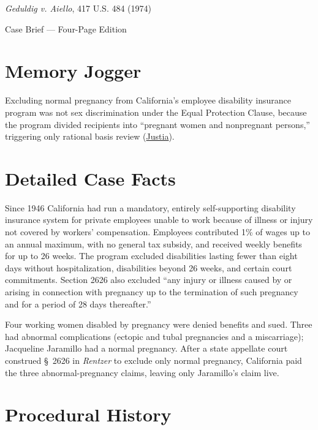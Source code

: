 \documentclass[12pt]{article}
\begin{document}
\begin{center}
{\LARGE \textit{Geduldig v. Aiello}, 417 U.S. 484 (1974)\par}
\vspace{0.8em}
{\large Case Brief --- Four-Page Edition\par}
\end{center}
\vspace{1em}

\section{Memory Jogger}

Excluding normal pregnancy from California's employee disability insurance program was not sex discrimination under the Equal Protection Clause, because the program divided recipients into ``pregnant women and nonpregnant persons,'' triggering only rational basis review (\href{https://supreme.justia.com/cases/federal/us/417/484/}{Justia}).

\section{Detailed Case Facts}

Since 1946 California had run a mandatory, entirely self-supporting disability insurance system for private employees unable to work because of illness or injury not covered by workers' compensation. Employees contributed 1\% of wages up to an annual maximum, with no general tax subsidy, and received weekly benefits for up to 26 weeks. The program excluded disabilities lasting fewer than eight days without hospitalization, disabilities beyond 26 weeks, and certain court commitments. Section 2626 also excluded ``any injury or illness caused by or arising in connection with pregnancy up to the termination of such pregnancy and for a period of 28 days thereafter.''

Four working women disabled by pregnancy were denied benefits and sued. Three had abnormal complications (ectopic and tubal pregnancies and a miscarriage); Jacqueline Jaramillo had a normal pregnancy. After a state appellate court construed \S~2626 in \textit{Rentzer} to exclude only normal pregnancy, California paid the three abnormal-pregnancy claims, leaving only Jaramillo's claim live.

\section{Procedural History}
\end{document}
